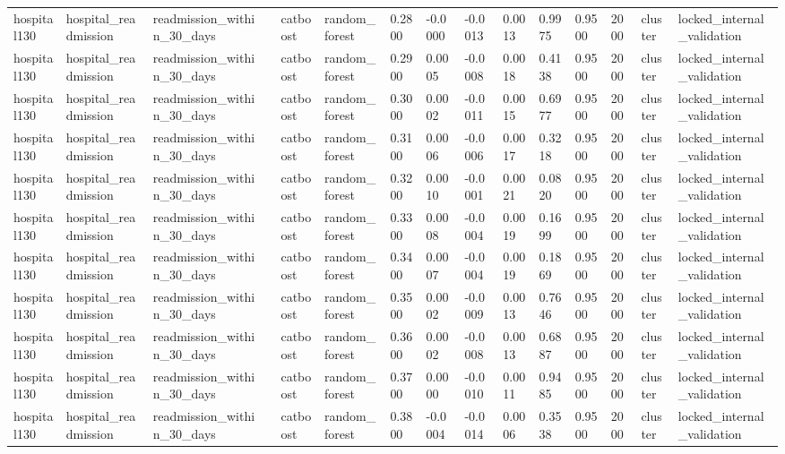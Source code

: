 \begin{tabular}{lllllllllllllll}
hospital130 & hospital\_readmission & readmission\_within\_30\_days &  & catboost & random\_forest & 0.2800 & -0.0000 & -0.0013 & 0.0013 & 0.9975 & 0.9500 & 2000 & cluster & locked\_internal\_validation \\
hospital130 & hospital\_readmission & readmission\_within\_30\_days &  & catboost & random\_forest & 0.2900 & 0.0005 & -0.0008 & 0.0018 & 0.4138 & 0.9500 & 2000 & cluster & locked\_internal\_validation \\
hospital130 & hospital\_readmission & readmission\_within\_30\_days &  & catboost & random\_forest & 0.3000 & 0.0002 & -0.0011 & 0.0015 & 0.6977 & 0.9500 & 2000 & cluster & locked\_internal\_validation \\
hospital130 & hospital\_readmission & readmission\_within\_30\_days &  & catboost & random\_forest & 0.3100 & 0.0006 & -0.0006 & 0.0017 & 0.3218 & 0.9500 & 2000 & cluster & locked\_internal\_validation \\
hospital130 & hospital\_readmission & readmission\_within\_30\_days &  & catboost & random\_forest & 0.3200 & 0.0010 & -0.0001 & 0.0021 & 0.0820 & 0.9500 & 2000 & cluster & locked\_internal\_validation \\
hospital130 & hospital\_readmission & readmission\_within\_30\_days &  & catboost & random\_forest & 0.3300 & 0.0008 & -0.0004 & 0.0019 & 0.1699 & 0.9500 & 2000 & cluster & locked\_internal\_validation \\
hospital130 & hospital\_readmission & readmission\_within\_30\_days &  & catboost & random\_forest & 0.3400 & 0.0007 & -0.0004 & 0.0019 & 0.1869 & 0.9500 & 2000 & cluster & locked\_internal\_validation \\
hospital130 & hospital\_readmission & readmission\_within\_30\_days &  & catboost & random\_forest & 0.3500 & 0.0002 & -0.0009 & 0.0013 & 0.7646 & 0.9500 & 2000 & cluster & locked\_internal\_validation \\
hospital130 & hospital\_readmission & readmission\_within\_30\_days &  & catboost & random\_forest & 0.3600 & 0.0002 & -0.0008 & 0.0013 & 0.6887 & 0.9500 & 2000 & cluster & locked\_internal\_validation \\
hospital130 & hospital\_readmission & readmission\_within\_30\_days &  & catboost & random\_forest & 0.3700 & 0.0000 & -0.0010 & 0.0011 & 0.9485 & 0.9500 & 2000 & cluster & locked\_internal\_validation \\
hospital130 & hospital\_readmission & readmission\_within\_30\_days &  & catboost & random\_forest & 0.3800 & -0.0004 & -0.0014 & 0.0006 & 0.3538 & 0.9500 & 2000 & cluster & locked\_internal\_validation \\

\end{tabular}
